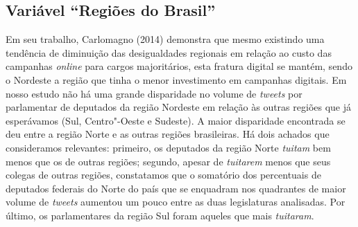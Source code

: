 \subsection{Variável ``Regiões do Brasil'' }

Em seu trabalho, Carlomagno (2014) demonstra que mesmo existindo uma
tendência de diminuição das desigualdades regionais em relação ao custo
das campanhas \emph{online} para cargos majoritários, esta fratura digital se
mantém, sendo o Nordeste a região que tinha o menor investimento em
campanhas digitais. Em nosso estudo não há uma grande disparidade no
volume de \emph{tweets} por parlamentar de deputados da região Nordeste
em relação às outras regiões que já esperávamos (Sul, Centro"-Oeste e
Sudeste). A maior disparidade encontrada se deu entre a região Norte e
as outras regiões brasileiras. Há dois achados que consideramos
relevantes: primeiro, os deputados da região Norte \emph{tuitam} bem
menos que os de outras regiões; segundo, apesar de \emph{tuitarem} menos
que seus colegas de outras regiões, constatamos que o somatório dos
percentuais de deputados federais do Norte do país que se enquadram nos
quadrantes de maior volume de \emph{tweets} aumentou um pouco entre as
duas legislaturas analisadas. Por último, os parlamentares da região Sul
foram aqueles que mais \emph{tuitaram}.

